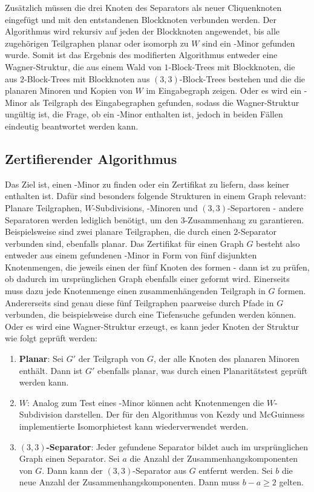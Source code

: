 Zusätzlich müssen die drei Knoten des Separators als neuer Cliquenknoten eingefügt und mit den entstandenen Blockknoten verbunden werden.
Der Algorithmus wird rekursiv auf jeden der Blockknoten angewendet, bis alle zugehörigen Teilgraphen planar oder isomorph zu $W$ sind \bzw ein \kf-Minor gefunden wurde.
Somit ist das Ergebnis des modifierten Algorithmus entweder eine Wagner-Struktur, die aus einem Wald von $1$-Block-Trees mit Blockknoten, die aus $2$-Block-Trees mit Blockknoten aus $(3, 3)$-Block-Trees bestehen und die die planaren Minoren und Kopien von $W$ im Eingabegraph zeigen.
Oder es wird ein \kf-Minor als Teilgraph des Eingabegraphen gefunden, sodass die Wagner-Struktur ungültig ist, die Frage, ob ein \kf-Minor enthalten ist, jedoch in beiden Fällen eindeutig beantwortet werden kann.

\subsection{Zertifierender Algorithmus}
Das Ziel ist, einen \kf-Minor zu finden oder ein Zertifikat zu liefern, dass keiner enthalten ist.
Dafür sind besonders folgende Strukturen in einem Graph relevant: Planare Teilgraphen, $W$-Subdivisions, \kf-Minoren und $(3, 3)$-Separtoren - andere Separatoren werden lediglich benötigt, um den $3$-Zusammenhang zu garantieren.
Beispielsweise sind zwei planare Teilgraphen, die durch einen $2$-Separator verbunden sind, ebenfalls planar.
Das Zertifikat für einen Graph $G$ besteht also entweder aus einem gefundenen \kf-Minor in Form von fünf disjunkten Knotenmengen, die jeweils einen der fünf Knoten des \kf formen - dann ist zu prüfen, ob dadurch im ursprünglichen Graph ebenfalls einer geformt wird.
Einerseits muss dazu jede Knotenmenge einen zusammenhängenden Teilgraph in $G$ formen.
Andererseits sind genau diese fünf Teilgraphen paarweise durch Pfade in $G$ verbunden, die beispielsweise durch eine Tiefensuche gefunden werden können.
Oder es wird eine Wagner-Struktur erzeugt, es kann jeder Knoten der Struktur wie folgt geprüft werden:
\begin{enumerate}
  \item \textbf{Planar}: Sei $G'$ der Teilgraph von $G$, der alle Knoten des planaren Minoren enthält.
        Dann ist $G'$ ebenfalls planar, was \zB durch einen Planaritätstest geprüft werden kann.
  \item \textbf{$W$}: Analog zum Test eines \kf-Minor können acht Knotenmengen die $W$-Subdivision darstellen.
        Der für den Algorithmus von Kezdy und McGuinness implementierte Isomorphietest kann wiederverwendet werden. %
  \item \textbf{$(3, 3)$-Separator}: Jeder gefundene Separator bildet auch im ursprünglichen Graph einen Separator.
        Sei $a$ die Anzahl der Zusammenhangskomponenten von $G$.
        Dann kann der $(3, 3)$-Separator aus $G$ entfernt werden.
        Sei $b$ die neue Anzahl der Zusammenhangskomponenten.
        Dann muss $b - a \geq 2$ gelten.
\end{enumerate}
